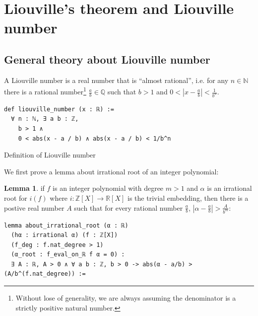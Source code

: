 \documentclass{report}
\theoremstyle{definition}
\newtheorem{lemma}{Lemma}[section]
\newenvironment{code}{\captionsetup{type=listing}}{}
\begin{document}
\section{Liouville's theorem and Liouville number}\label{fmlsn:li}
\subsection*{General theory about Liouville number}
A Liouville number is a real number that is ``almost rational'', i.e. for any $n\in\mathbb N$ there is a rational number\footnote{Without lose of generality, we are always assuming the denominator is a strictly positive natural number.} $\frac ab\in\mathbb Q$ such that $b > 1$ and $0<|x-\frac ab|<\frac1{b^n}$.
\begin{code}
\begin{verbatim}
def liouville_number (x : ℝ) := 
  ∀ n : ℕ, ∃ a b : ℤ,  
    b > 1 ∧ 
    0 < abs(x - a / b) ∧ abs(x - a / b) < 1/b^n
\end{verbatim}
\caption{Definition of Liouville number}
\end{code}

We first prove a lemma about irrational root of an integer polynomial:
\begin{lemma}\label{lemma:irrationalRoot}
if $f$ is an integer polynomial with degree $m>1$ and $\alpha$ is an irrational root for $i(f)$ where $i:\mathbb Z[X]\to\mathbb R[X]$ is the trivial embedding, then there is a postive real number $A$ such that for every rational number $\frac ab$, $\left|\alpha-\frac ab\right|>\frac A {b^m}$:  

\begin{verbatim}
lemma about_irrational_root (α : ℝ)
  (hα : irrational α) (f : ℤ[X]) 
  (f_deg : f.nat_degree > 1)
  (α_root : f_eval_on_ℝ f α = 0) :
  ∃ A : ℝ, A > 0 ∧ ∀ a b : ℤ, b > 0 -> abs(α - a/b) > (A/b^(f.nat_degree)) :=
\end{verbatim}
\end{lemma}
\end{document}
